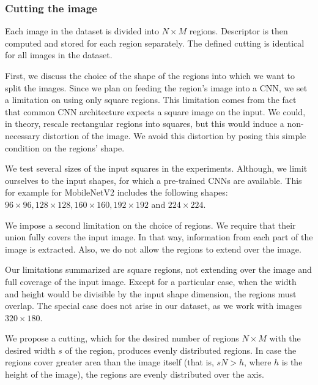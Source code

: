 \subsubsection{Cutting the image}

Each image in the dataset is divided into $N \times M$ regions. Descriptor is then computed and stored for each region separately. The defined cutting is identical for all images in the dataset.

First, we discuss the choice of the shape of the regions into which we want to split the images. Since we plan on feeding the region's image into a CNN, we set a limitation on using only square regions. This limitation comes from the fact that common CNN architecture expects a square image on the input. We could, in theory, rescale rectangular regions into squares, but this would induce a non-necessary distortion of the image. We avoid this distortion by posing this simple condition on the regions' shape.

We test several sizes of the input squares in the experiments. Although, we limit ourselves to the input shapes, for which a pre-trained CNNs are available. This for example for MobileNetV2 includes the following shapes: $96 \times 96, 128 \times 128, 160 \times 160, 192 \times 192$ and $224 \times 224$.

We impose a second limitation on the choice of regions. We require that their union fully covers the input image. In that way, information from each part of the image is extracted. Also, we do not allow the regions to extend over the image. 

Our limitations summarized are square regions, not extending over the image and full coverage of the input image. Except for a particular case, when the width and height would be divisible by the input shape dimension, the regions must overlap. The special case does not arise in our dataset, as we work with images $320 \times 180$.

We propose a cutting, which for the desired number of regions $N \times M$ with the desired width $s$ of the region, produces evenly distributed regions. In case the regions cover greater area than the image itself (that is, $sN > h$, where $h$ is the height of the image), the regions are evenly distributed over the axis.


